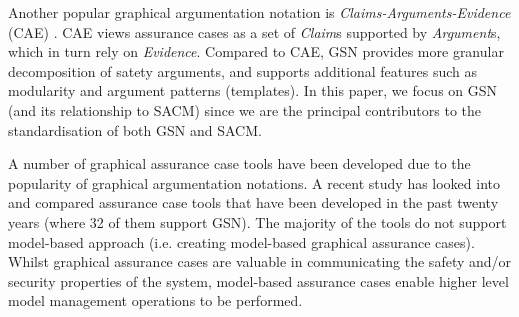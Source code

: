 Another popular graphical argumentation notation is \textit{Claims-Arguments-Evidence} (CAE) \cite{bishop2000methodology}. 
CAE views assurance cases as a set of \textit{Claim}s supported by \textit{Argument}s, which in turn rely on \textit{Evidence}.
Compared to CAE, 
GSN provides more granular decomposition of satety arguments, and supports additional features such as modularity and argument patterns (templates).
In this paper, we focus on GSN (and its relationship to SACM) since we are the principal contributors to the standardisation of both GSN and SACM.

A number of graphical assurance case tools have been developed due to the popularity of graphical argumentation notations. 
A recent study \cite{maksimov2018} has looked into and compared assurance case tools that have been developed in the past twenty years (where 32 of them support GSN). 
The majority of the tools do not support model-based approach (i.e. creating model-based graphical assurance cases).
Whilst graphical assurance cases are valuable in communicating the safety and/or security properties of the system, model-based assurance cases enable higher level model management operations to be performed.
%


